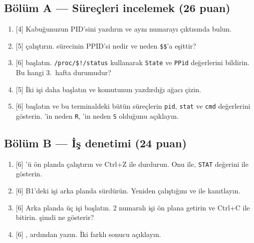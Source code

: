 \subsection*{Bölüm A --- Süreçleri incelemek (26 puan)}
\begin{enumerate}[leftmargin=2.2em,label=\textbf{A\arabic*}]
  \item {[4]} Kabuğunuzun PID'sini yazdırın ve aynı numarayı  çıktısında bulun.
  \item {[5]}  çalıştırın.  sürecinin PPID'si nedir ve neden \verb|$$|'a eşittir?
  \item {[6]}  başlatın. \texttt{/proc/\$!/status} kullanarak \texttt{State} ve \texttt{PPid} değerlerini bildirin. Bu hangi 3.~hafta durumudur?
  \item {[5]} İki  işi daha başlatın ve  komutunun yazdırdığı ağacı çizin.
  \item {[6]}  başlatın ve bu terminaldeki bütün süreçlerin \texttt{pid}, \texttt{stat} ve \texttt{cmd} değerlerini gösterin. 'in neden \texttt{R}, 'in neden \texttt{S} olduğunu açıklayın.
\end{enumerate}

\subsection*{Bölüm B --- İş denetimi (24 puan)}
\begin{enumerate}[leftmargin=2.2em,label=\textbf{B\arabic*}]
  \item {[6]} 'ü ön planda çalıştırın ve Ctrl+Z ile durdurun. Onu  ile, \texttt{STAT} değerini  ile gösterin.
  \item {[6]} B1'deki işi arka planda sürdürün. Yeniden çalıştığını  ve  ile kanıtlayın.
  \item {[6]} Arka planda üç  işi başlatın. 2 numaralı işi ön plana getirin ve Ctrl+C ile bitirin.  şimdi ne gösterir?
  \item {[6]} , ardından  yazın. İki farklı sonucu açıklayın.
\end{enumerate}

